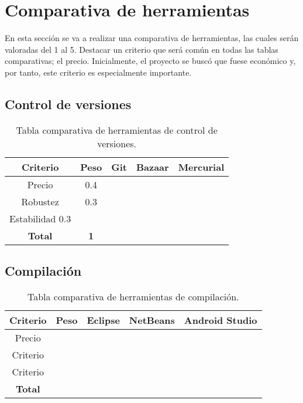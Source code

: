 \section{Comparativa de herramientas}

En esta sección se va a realizar una comparativa de herramientas, las cuales serán valoradas del 1 al 5. Destacar un criterio que será común en todas las tablas comparativas; el precio. Inicialmente, el proyecto se buscó que fuese económico y, por tanto, este criterio es especialmente importante.

\subsection{Control de versiones}

\begin{table}[H]
	\begin{center}
		\begin{tabular}{|c||c|c|c|c|}
			\hline
			Criterio & Peso & Git & Bazaar & Mercurial \\
			\hline \hline
			Precio & 0.4 &  &  &  \\ \hline
			Robustez & 0.3 &  &  &  \\ \hline
			Estabilidad 0.3 &  &  &  &  \\ \hline
			\textbf{Total} & \textbf{1} & \textbf{} & \textbf{} & \textbf{} \\ \hline
		\end{tabular}
		\caption{Tabla comparativa de herramientas de control de versiones.}
		\label{tabla:tabla1}
	\end{center}
\end{table}

\subsection{Compilación}

\begin{table}[H]
	\begin{center}
		\begin{tabular}{|c||c|c|c|c|}
			\hline
			Criterio & Peso & Eclipse & NetBeans & Android Studio \\
			\hline \hline
			Precio &  &  &  &  \\ \hline
			Criterio &  &  &  &  \\ \hline
			Criterio &  &  &  &  \\ \hline
			\textbf{Total} & \textbf{} & \textbf{} & \textbf{} & \textbf{} \\ \hline
		\end{tabular}
		\caption{Tabla comparativa de herramientas de compilación.}
		\label{tabla:tabla2}
	\end{center}
\end{table}

